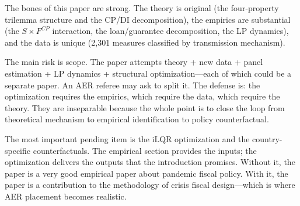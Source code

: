 \documentclass[12pt, a4paper]{article}
\begin{document}
The bones of this paper are strong. The theory is original (the four-property trilemma structure and the CP/DI decomposition), the empirics are substantial (the $S \times F^{CP}$ interaction, the loan/guarantee decomposition, the LP dynamics), and the data is unique (2,301 measures classified by transmission mechanism).

The main risk is scope. The paper attempts theory + new data + panel estimation + LP dynamics + structural optimization---each of which could be a separate paper. An AER referee may ask to split it. The defense is: the optimization requires the empirics, which require the data, which require the theory. They are inseparable because the whole point is to close the loop from theoretical mechanism to empirical identification to policy counterfactual.

The most important pending item is the iLQR optimization and the country-specific counterfactuals. The empirical section provides the inputs; the optimization delivers the outputs that the introduction promises. Without it, the paper is a very good empirical paper about pandemic fiscal policy. With it, the paper is a contribution to the methodology of crisis fiscal design---which is where AER placement becomes realistic.
\end{document}
